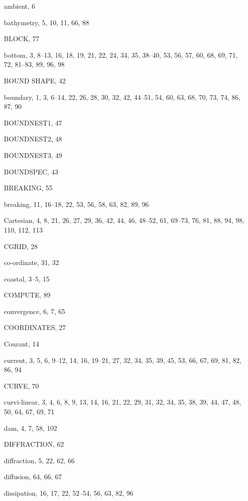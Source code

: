 \documentclass[12pt]{book}
\begin{document}
\begin{theindex}
  \item ambient, 6

  \indexspace

  \item bathymetry, 5, 10, 11, 66, 88
  \item BLOCK, 77
  \item bottom, 3, 8--13, 16, 18, 19, 21, 22, 24, 34, 35, 38--40, 53,
		56, 57, 60, 68, 69, 71, 72, 81--83, 89, 96, 98
  \item BOUND SHAPE, 42
  \item boundary, 1, 3, 6--14, 22, 26, 28, 30, 32, 42, 44--51, 54, 60,
		63, 68, 70, 73, 74, 86, 87, 90
  \item BOUNDNEST1, 47
  \item BOUNDNEST2, 48
  \item BOUNDNEST3, 49
  \item BOUNDSPEC, 43
  \item BREAKING, 55
  \item breaking, 11, 16--18, 22, 53, 56, 58, 63, 82, 89, 96

  \indexspace

  \item Cartesian, 4, 8, 21, 26, 27, 29, 36, 42, 44, 46, 48--52, 61,
		69--73, 76, 81, 88, 94, 98, 110, 112, 113
  \item CGRID, 28
  \item co-ordinate, 31, 32
  \item coastal, 3--5, 15
  \item COMPUTE, 89
  \item convergence, 6, 7, 65
  \item COORDINATES, 27
  \item Courant, 14
  \item current, 3, 5, 6, 9--12, 14, 16, 19--21, 27, 32, 34, 35, 39, 45,
		53, 66, 67, 69, 81, 82, 86, 94
  \item CURVE, 70
  \item curvi-linear, 3, 4, 6, 8, 9, 13, 14, 16, 21, 22, 29, 31, 32,
		34, 35, 38, 39, 44, 47, 48, 50, 64, 67, 69, 71

  \indexspace

  \item dam, 4, 7, 58, 102
  \item DIFFRACTION, 62
  \item diffraction, 5, 22, 62, 66
  \item diffusion, 64, 66, 67
  \item dissipation, 16, 17, 22, 52--54, 56, 63, 82, 96


\end{theindex}
\end{document}
